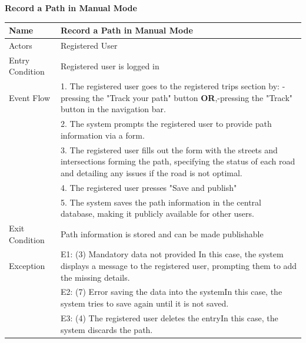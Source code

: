 \begin{enumerate}[label=\textbf{[UC\arabic*]}]
    \item \textbf{Record a Path in Manual Mode}
        \begin{center}
            \begin{tabular}{|p{4cm}|p{11cm}|}
                \hline
                \textbf{Name} & \textbf{Record a Path in Manual Mode} \\
                \hline
                Actors & Registered User \\
                \hline
                Entry Condition & Registered user is logged in \\
                \hline
                Event Flow & 1. The registered user goes to the registered trips section by: \newline -pressing the "Track your path" button \textbf{OR},\newline -pressing the "Track" button in the navigation bar.\\
                & 2. The system prompts the registered user to provide path information via a form. \\
                & 3. The registered user fills out the form with the streets and intersections forming the path, specifying the status of each road and detailing any issues if the road is not optimal.\\
                & 4. The registered user presses "Save and publish" \\
                & 5. The system saves the path information in the central database, making it publicly available for other users. \\
                \hline
                Exit Condition & Path information is stored and can be made publishable \\
                \hline
                Exception & E1: (3) Mandatory data not provided \newline In this case, the system displays a message to the registered user, prompting them to add the missing details. \\
                & E2: (7) Error saving the data into the system\newline In this case, the system tries to save again until it is not saved. \\
                & E3: (4) The registered user deletes the entry\newline In this case, the system discards the path. \\
                \hline
            \end{tabular}

\end{center}
\end{enumerate}
